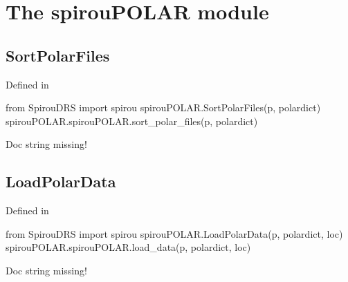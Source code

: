 \clearpage
\newpage
\noindent\begin{minipage}{\textwidth}
\section{The spirouPOLAR module}
\label{ch:the_module:spirouPOLAR}

\subsection{SortPolarFiles}

Defined in \spirouPOLAR{}

\begin{pythonbox}
from SpirouDRS import spirou
spirouPOLAR.SortPolarFiles(p, polardict)
spirouPOLAR.spirouPOLAR.sort_polar_files(p, polardict)
\end{pythonbox}

\begin{pythondocstring}
Doc string missing!
\end{pythondocstring}
\end{minipage}


\noindent\begin{minipage}{\textwidth}
\subsection{LoadPolarData}

Defined in \spirouPOLAR{}

\begin{pythonbox}
from SpirouDRS import spirou
spirouPOLAR.LoadPolarData(p, polardict, loc)
spirouPOLAR.spirouPOLAR.load_data(p, polardict, loc)
\end{pythonbox}

\begin{pythondocstring}
Doc string missing!
\end{pythondocstring}
\end{minipage}



